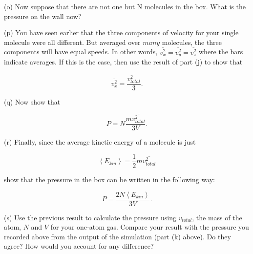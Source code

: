 (o) Now suppose that there are not one but N molecules in the box. What
is the pressure on the wall now?
\vspace{20mm}

(p) You have seen earlier that the three components of velocity for your single molecule were all different.  But averaged over $many$ molecules, the three components will have equal speeds.  In other words, \( \overline{v_{x}^{2}}=\overline{v_{y}^{2}}=\overline{v_{z}^{2}} \) where the bars indicate averages. If this is the case, then use the result of part (j) to show that

\[
\overline{v_{x}^{2}}=\frac{\overline{v_{total}^{2}}}{3}.\]


(q) Now show that 

\[
P=N\frac{m\overline{v_{total}^{2}}}{3V}.\]

\vspace{20mm}

(r) Finally, since the average kinetic energy of a molecule is just

\[
\left<E_{kin}\right>=\frac{1}{2}m\overline{v_{total}^{2}}\]


show that the pressure in the box can be written in the following
way:

\[
P=\frac{2N\left<E_{kin}\right>}{3V}.\]
\vspace{20mm}

(s) Use the previous result to calculate the pressure using $v_{total}$, the mass of the atom, $N$ and $V$ for your one-atom gas. Compare your result with the pressure you recorded above from the output of the simulation (part (k) above).
Do they agree? How would you account for any difference?
\vspace{20mm}
